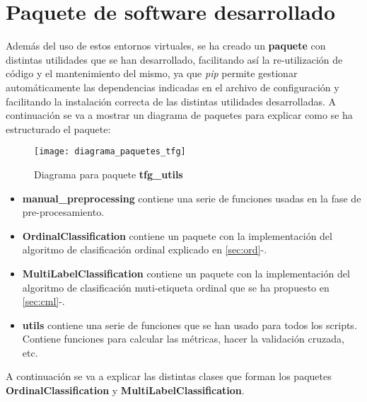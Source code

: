 \section{Paquete de software desarrollado}
Además del uso de estos entornos virtuales, se ha creado un \textbf{paquete} con distintas utilidades que se han desarrollado, facilitando así la re-utilización de código y el mantenimiento del mismo, ya que \textit{pip} permite gestionar automáticamente las dependencias indicadas en el archivo de configuración y facilitando la instalación correcta de las distintas utilidades desarrolladas.
A continuación se va a mostrar un diagrama de paquetes para explicar como se ha estructurado el paquete:
\begin{figure}[H]
    \centering
    \texttt{[image: diagrama\_paquetes\_tfg]}
    \caption{Diagrama para paquete \textbf{tfg\_utils}}
    \label{dig:paquetes_tfg}
\end{figure}
\begin{itemize}
    \item \textbf{manual\_preprocessing} contiene una serie de funciones usadas en la fase de pre-procesamiento.
    \item \textbf{OrdinalClassification} contiene un paquete con la implementación del algoritmo de clasificación ordinal explicado en \ref{sec:ord}-.
    \item \textbf{MultiLabelClassification} contiene un paquete con la implementación del algoritmo de clasificación muti-etiqueta ordinal que se ha propuesto en \ref{sec:cml}-.
    \item \textbf{utils} contiene una serie de funciones que se han usado para todos los scripts. Contiene funciones para calcular las métricas, hacer la validación cruzada, etc.
\end{itemize}
A continuación se va a explicar las distintas clases que forman los paquetes \textbf{OrdinalClassification} y \textbf{MultiLabelClassification}. 
\clearpage
